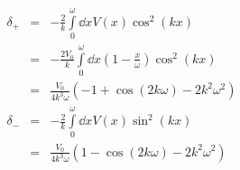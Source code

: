 \begin{eqnarray}
δ_+ &=& -\frac{2}{k}\int\limits_0^ω\dd{x}V(x)\cos^2(kx)\\
&=& -\frac{2 V_0}{k}\int\limits_0^ω\dd{x}(1-\frac{x}{ω})\cos^2(kx)\\
&=& \frac{V_0}{4k^3 ω} \left(-1 + \cos(2kω) - 2k^2 ω^2\right)\\
δ_- &=& -\frac{2}{k}\int\limits_0^ω\dd{x}V(x)\sin^2(kx)\\
&=& \frac{V_0}{4k^3 ω} \left(1 - \cos(2kω) - 2k^2 ω^2\right)
\end{eqnarray}
